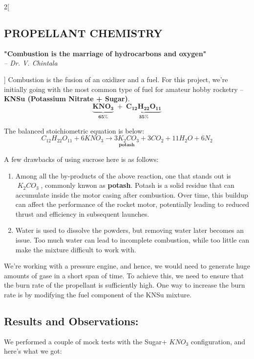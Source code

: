 \documentclass[10pt]{report}
\begin{document}
\newpage 
\begin{multicols*}{2}[
  \begin{center}
    \section*{PROPELLANT CHEMISTRY}
    \textbf{"Combustion is the marriage of hydrocarbons and oxygen"} \\
    \hfill  \textit{ -- Dr. V. Chintala}
  \end{center} ]
  Combustion is the fusion of an oxidizer and a fuel. For this project, we're initially going with the most common type of fuel for amateur hobby rocketry -- \textbf{KNSu (Potassium Nitrate + Sugar)}. 
  \[ \boldsymbol{\underbrace{KNO_3}_{65 \%} \; + \; \underbrace{C_{12} H_{22} O_{11}}_{35 \%}} \]

  \noindent The balanced stoichiometric equation is below:
  \[ C_{12}H_{22}O_{11} + 6 KNO_3 \rightarrow \underset{\textbf{potash}}{3K_2CO_3} + 3CO_2+11H_2O+6N_2 \] 

  \noindent A few drawbacks of using sucrose here is as follows:
  \begin{enumerate}
    \item Among all the by-products of the above reaction, one that stands out is $\; K_2 CO_3\;$, commonly knwon as \textbf{potash}. Potash is a solid residue that can accumulate inside the motor casing after combustion. Over time, this buildup can affect the performance of the rocket motor, potentially leading to reduced thrust and efficiency in subsequent launches. 
    \item  Water is used to dissolve the powders, but removing water later becomes an issue. Too much water can lead to incomplete combustion, while too little can make the mixture difficult to work with.
  \end{enumerate}

  We're working with a pressure engine, and hence, we would need to generate huge amounts of gase in a short span of time. To achieve this, we need to ensure that the burn rate of the propellant is sufficiently high. One way to increase the burn rate is by modifying the fuel component of the KNSu mixture. \\ 


  
    \subsection*{Results and Observations:}
  We performed a couple of mock tests with the Sugar+ $KNO_3$ configuration, and here's what we got: \\


\end{multicols*}
\end{document}
